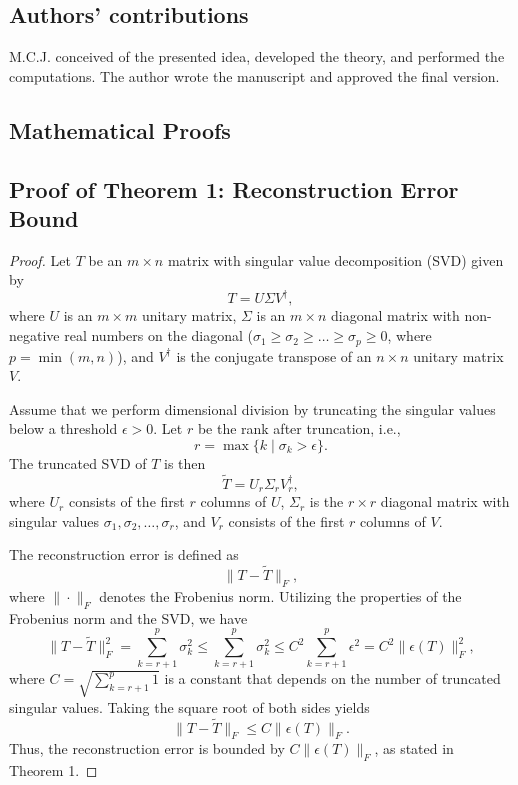\documentclass[sn-mathphys-num]{sn-jnl}
\theoremstyle{thmstyleone}
\theoremstyle{thmstyletwo}
\theoremstyle{thmstylethree}
\begin{document}
\subsection*{Authors' contributions}
M.C.J. conceived of the presented idea, developed the theory, and performed the computations. The author wrote the manuscript and approved the final version.

\begin{appendices}
\section{Mathematical Proofs}\label{appA}
\subsection{Proof of Theorem 1: Reconstruction Error Bound}\label{proof:theorem1}

\begin{proof}
Let \( T \) be an \( m \times n \) matrix with singular value decomposition (SVD) given by
\[
T = U \Sigma V^\dagger,
\]
where \( U \) is an \( m \times m \) unitary matrix, \( \Sigma \) is an \( m \times n \) diagonal matrix with non-negative real numbers on the diagonal (\( \sigma_1 \geq \sigma_2 \geq \dots \geq \sigma_p \geq 0 \), where \( p = \min(m, n) \)), and \( V^\dagger \) is the conjugate transpose of an \( n \times n \) unitary matrix \( V \).

Assume that we perform dimensional division by truncating the singular values below a threshold \( \epsilon > 0 \). Let \( r \) be the rank after truncation, i.e.,
\[
r = \max \{ k \mid \sigma_k > \epsilon \}.
\]
The truncated SVD of \( T \) is then
\[
\tilde{T} = U_r \Sigma_r V_r^\dagger,
\]
where \( U_r \) consists of the first \( r \) columns of \( U \), \( \Sigma_r \) is the \( r \times r \) diagonal matrix with singular values \( \sigma_1, \sigma_2, \dots, \sigma_r \), and \( V_r \) consists of the first \( r \) columns of \( V \).

The reconstruction error is defined as
\[
\| T - \tilde{T} \|_F,
\]
where \( \| \cdot \|_F \) denotes the Frobenius norm. Utilizing the properties of the Frobenius norm and the SVD, we have
\[
\| T - \tilde{T} \|_F^2 = \sum_{k=r+1}^p \sigma_k^2 \leq \sum_{k=r+1}^p \sigma_k^2 \leq C^2 \sum_{k=r+1}^p \epsilon^2 = C^2 \| \epsilon(T) \|_F^2,
\]
where \( C = \sqrt{\sum_{k=r+1}^p 1} \) is a constant that depends on the number of truncated singular values. Taking the square root of both sides yields
\[
\| T - \tilde{T} \|_F \leq C \| \epsilon(T) \|_F.
\]
Thus, the reconstruction error is bounded by \( C \| \epsilon(T) \|_F \), as stated in Theorem 1.
\end{proof}


\end{appendices}
\end{document}
